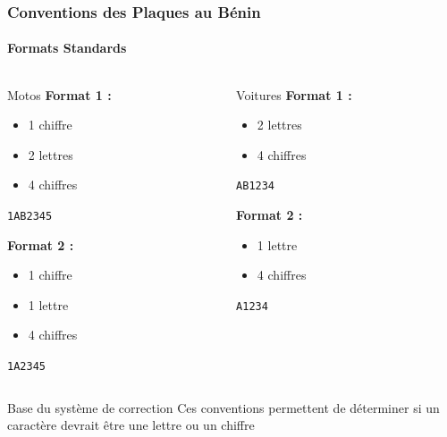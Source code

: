 \documentclass[
	11pt,
	aspectratio=169,
]{beamer}
\begin{document}
\begin{frame}
	\frametitle{Conventions des Plaques au Bénin}
	\framesubtitle{Formats Standards}
	
	\begin{columns}[t]
		\begin{column}{0.48\textwidth}
			\begin{block}{Motos}
				\textbf{Format 1 :}
				\begin{itemize}
					\item 1 chiffre
					\item 2 lettres
					\item 4 chiffres
				\end{itemize}
				\centering
				\texttt{1AB2345}
				
				\smallskip
				
				\textbf{Format 2 :}
				\begin{itemize}
					\item 1 chiffre
					\item 1 lettre
					\item 4 chiffres
				\end{itemize}
				\centering
				\texttt{1A2345}
			\end{block}
		\end{column}
		
		\begin{column}{0.48\textwidth}
			\begin{block}{Voitures}
				\textbf{Format 1 :}
				\begin{itemize}
					\item 2 lettres
					\item 4 chiffres
				\end{itemize}
				\centering
				\texttt{AB1234}
				
				\smallskip
				
				\textbf{Format 2 :}
				\begin{itemize}
					\item 1 lettre
					\item 4 chiffres
				\end{itemize}
				\centering
				\texttt{A1234}
			\end{block}
		\end{column}
	\end{columns}
	
	\bigskip
	
	\begin{alertblock}{Base du système de correction}
		Ces conventions permettent de déterminer si un caractère devrait être une lettre ou un chiffre
	\end{alertblock}
\end{frame}
\end{document}
